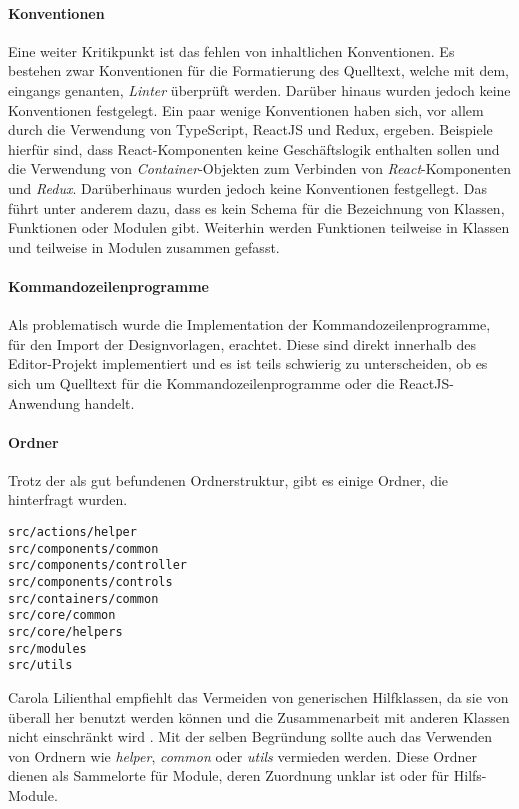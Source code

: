 \paragraph{Konventionen}
Eine weiter Kritikpunkt ist das fehlen von inhaltlichen Konventionen. Es bestehen zwar Konventionen für die Formatierung des Quelltext, welche mit dem, eingangs genanten, \emph{Linter} überprüft werden. Darüber hinaus wurden jedoch keine Konventionen festgelegt. 
Ein paar wenige Konventionen haben sich, vor allem durch die Verwendung von TypeScript, ReactJS und Redux, ergeben. Beispiele hierfür sind, dass React-Komponenten keine Geschäftslogik enthalten sollen und die Verwendung von \emph{Container}-Objekten zum Verbinden von \emph{React}-Komponenten und \emph{Redux}.
Darüberhinaus wurden jedoch keine Konventionen festgellegt.
Das führt unter anderem dazu, dass es kein Schema für die Bezeichnung von Klassen, Funktionen oder Modulen gibt. Weiterhin werden Funktionen teilweise in Klassen und teilweise in Modulen zusammen gefasst. 

\paragraph{Kommandozeilenprogramme} 
Als problematisch wurde die Implementation der Kommandozeilenprogramme, für den Import der Designvorlagen, erachtet. Diese sind direkt innerhalb des Editor-Projekt implementiert und es ist teils schwierig zu unterscheiden, ob es sich um Quelltext für die Kommandozeilenprogramme oder die ReactJS-Anwendung handelt. 

\paragraph{Ordner} Trotz der als gut befundenen Ordnerstruktur, gibt es einige Ordner, die hinterfragt wurden.
\lstset{language=sh}
\begin{lstlisting}
src/actions/helper
src/components/common
src/components/controller
src/components/controls
src/containers/common
src/core/common
src/core/helpers
src/modules
src/utils
\end{lstlisting}

Carola Lilienthal empfiehlt das Vermeiden von generischen Hilfklassen, da sie von überall her benutzt werden können und die Zusammenarbeit mit anderen Klassen nicht einschränkt wird \autocite[vgl.][159]{Lilienthal2019}.    
Mit der selben Begründung sollte auch das Verwenden von Ordnern wie \emph{helper}, \emph{common} oder \emph{utils} vermieden werden. Diese Ordner dienen als Sammelorte für Module, deren Zuordnung unklar ist oder für Hilfs-Module. 

